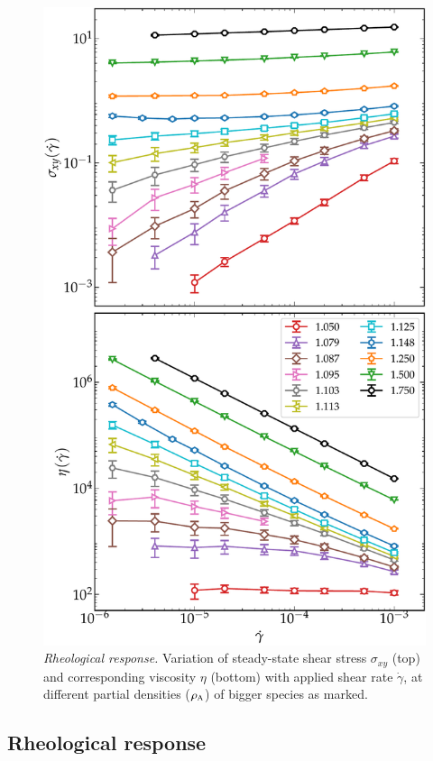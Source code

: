 \begin{figure}[htb!]
    \centering
	\includegraphics[width=12cm]{figs/fig7p3.pdf}
	\caption[{\em Variation of steady-state shear stress and corresponding viscosity with applied shear rate}]{{\em Rheological response.} Variation of steady-state shear stress $\sigma_{xy}$ (top) and corresponding viscosity $\eta$ (bottom) with applied shear rate $\dot{\gamma}$, at different partial densities ($\rho_{\rm A}$) of bigger species as marked. 
\label{fig7p3}}
\end{figure}
%

%

\subsection{Rheological response}

